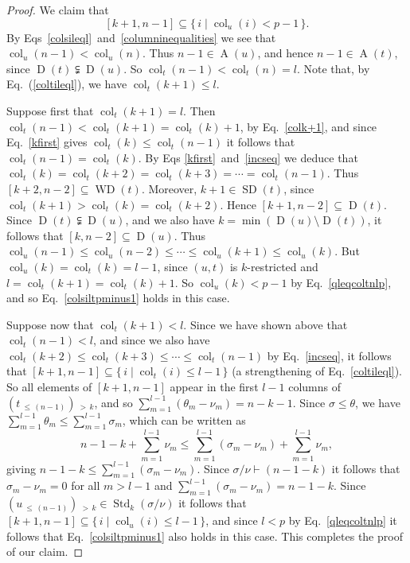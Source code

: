 \documentclass[ALCO,ThmDefs,Unicode,epreuves]{cedram}
\DeclareMathOperator{\col}{col}
\newcommand{\morethan}[2]{#1\,{_{>\,#2}}}
\newcommand{\Lessthan}[2]{#1\,{_{\leqslant\,#2}}}
\DeclareMathOperator{\STD}{Std}
\DeclareMathOperator{\SD}{SD}
\DeclareMathOperator{\WD}{WD}
\DeclareMathOperator{\D}{D}
\DeclareMathOperator{\A}{A}
\begin{document}
\begin{proof}
We claim that
\begin{equation}\label{colsiltpminus1}
[k+1,n-1] \subseteq \{\,i\mid\col_u(i)<p-1\,\}.
\end{equation}
By Eqs~\eqref{colsileql}~and~\eqref{columninequalities} we see that
$\col_u(n-1)<\col_u(n)$. Thus $n-1\in\A(u)$, and hence $n-1\in\A(t)$, since
$\D(t)\subsetneqq\D(u)$. So $\col_t(n-1)<\col_t(n)=l$.
Note that, by Eq.~(\ref{coltileql}), we have $\col_t(k+1)\leq l$.

Suppose first that $\col_t(k+1)=l$. Then $\col_t(n-1)<\col_t(k+1)=\col_t(k)+1$,
by Eq.~\eqref{colk+1}, and since Eq.~\eqref{kfirst} gives $\col_t(k)\leqslant\col_t(n-1)$
it follows that $\col_t(n-1)=\col_t(k)$. By Eqs \eqref{kfirst}~and~\eqref{incseq}
we deduce that $\col_t(k)=\col_t(k+2)=\col_t(k+3)=\cdots=\col_t(n-1)$.
Thus $[k+2,n-2]\subseteq\WD(t)$. Moreover, $k+1\in\SD(t)$, since
$\col_t(k+1)>\col_t(k)=\col_t(k+2)$. Hence $[k+1,n-2]\subseteq\D(t)$. Since
$\D(t)\subsetneqq\D(u)$, and we
also have $k=\min(\D(u)\setminus\D(t))$, it follows that $[k,n-2]\subseteq\D(u)$.
Thus $\col_u(n-1)\leqslant\col_u(n-2)\leqslant\cdots\leqslant\col_u(k+1)\leqslant\col_u(k)$.
But $\col_u(k)=\col_t(k)=l-1$, since $(u,t)$ is $k$-restricted and
$l=\col_t(k+1)=\col_t(k)+1$.
So $\col_u(k)<p-1$ by Eq.~\eqref{qleqcoltnlp}, and so Eq.~\eqref{colsiltpminus1}
holds in this case.

Suppose now that $\col_t(k+1)<l$. Since we have shown above that $\col_t(n-1)<l$,
and since we also have $\col_t(k+2)\leqslant\col_t(k+3)\leqslant\cdots\leqslant\col_t(n-1)$ by
Eq.~\eqref{incseq}, it follows that $[k+1,n-1]\subseteq\{\,i\mid\col_t(i)\leqslant l-1\,\}$
(a strengthening of Eq.~\eqref{coltileql}). So all elements of $[k+1,n-1]$ appear in
the first $l-1$ columns of $\morethan{(\Lessthan t{(n-1)})}k$, and so
$\sum_{m=1}^{l-1}(\theta_m-\nu_m)=n-k-1$. Since $\sigma\leqslant\theta$, we have
$\sum_{m=1}^{l-1}\theta_m\leqslant\sum_{m=1}^{l-1}\sigma_m$, which can be written as
\begin{equation*}
n-1-k + \sum_{m=1}^{l-1}\nu_m \leqslant\sum_{m=1}^{l-1} (\sigma_m-\nu_m) + \sum_{m=1}^{l-1}\nu_m,
\end{equation*}
giving $n-1-k\leqslant\sum_{m=1}^{l-1} (\sigma_m-\nu_m)$. Since
$\sigma/\nu\vdash(n-1-k)$ it follows that $\sigma_m-\nu_m=0$ for
all $m>l-1$ and $\sum_{m=1}^{l-1} (\sigma_m-\nu_m)= n-1-k$. Since
$\morethan{(\Lessthan u{(n-1)})}k\in\STD_k(\sigma/\nu)$ it follows that
$[k+1,n-1]\subseteq\{\,i\mid\col_u(i)\leqslant l-1\,\}$,
and since $l<p$ by Eq.~\eqref{qleqcoltnlp} it follows that
Eq.~\eqref{colsiltpminus1} also holds in this case. This completes the proof of our claim.


\end{proof}
\end{document}
